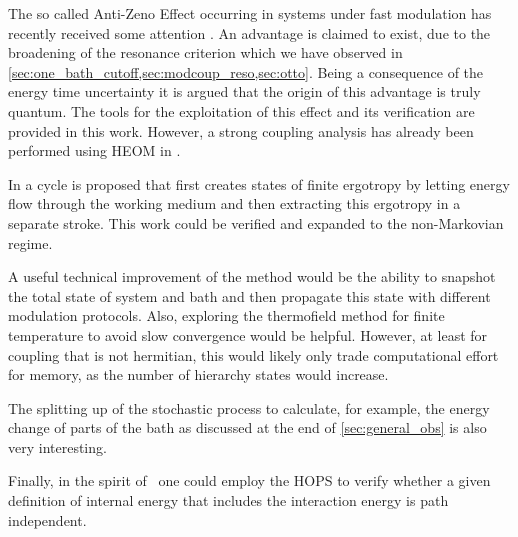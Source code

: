 The so called Anti-Zeno Effect occurring in systems under fast
modulation has recently received some attention
\cite{Mukherjee2020Jan,Xu2022Mar}. An advantage is claimed to exist,
due to the broadening of the resonance criterion which we have
observed in
\cref{sec:one_bath_cutoff,sec:modcoup_reso,sec:otto}. Being a
consequence of the energy time uncertainty it is argued that the
origin of this advantage is truly quantum. The tools for the
exploitation of this effect and its verification are provided in this
work. However, a strong coupling analysis has already been performed
using HEOM in .

In  a cycle is proposed that first creates states
of finite ergotropy by letting energy flow through the working medium
and then extracting this ergotropy in a separate stroke. This work
could be verified and expanded to the non-Markovian regime.

A useful technical improvement of the method would be the ability to
snapshot the total state of system and bath and then propagate this
state with different modulation protocols. Also, exploring the
thermofield method for finite temperature to avoid slow convergence
would be helpful. However, at least for coupling that is not
hermitian, this would likely only trade computational effort for
memory, as the number of hierarchy states would increase.

The splitting up of the stochastic process to calculate, for example, the
energy change of parts of the bath as discussed at the end of
\cref{sec:general_obs} is also very interesting.

Finally, in the spirit of~\cite{Esposito2015Dec} one could employ the
HOPS to verify whether a given definition of internal energy that
includes the interaction energy is path independent.
